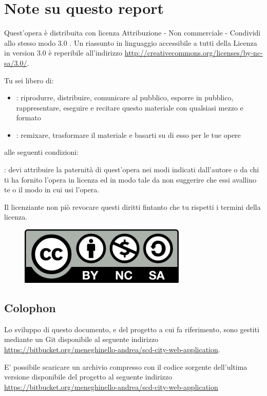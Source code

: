 %
\section*{Note su questo report}
Quest'opera è distribuita con licenza   Attribuzione - Non commerciale - Condividi allo stesso modo 3.0 . Un riassunto in linguaggio accessibile a tutti della Licenza in version 3.0 è reperibile all'indirizzo \url{http://creativecommons.org/licenses/by-nc-sa/3.0/}.

Tu sei libero di:
\begin{itemize}
\item{: riprodurre, distribuire, comunicare al pubblico, esporre in pubblico, rappresentare, eseguire e recitare questo materiale con qualsiasi mezzo e formato}
\item{: remixare, trasformare il materiale e basarti su di esso per le tue opere}
\end{itemize}
alle seguenti condizioni:

: devi attribuire la paternità di quest'opera nei modi indicati dall'autore o da chi ti ha fornito l'opera in licenza ed in modo tale da non suggerire che essi avallino te o il modo in cui usi l'opera.

Il licenziante non piò revocare questi diritti fintanto che tu rispetti i termini della licenza.

\begin{figure}[h]
\centerline{\includegraphics[scale=0.3]{images/abstract/cc-by-nc-sa.png}}
\end{figure}

\subsection*{Colophon}
Lo sviluppo di questo documento, e del progetto a cui fa riferimento, sono gestiti mediante un  Git disponibile al seguente indirizzo \url{https://bitbucket.org/meneghinello-andrea/scd-city-web-application}.

E' possibile scaricare un archivio compresso con il codice sorgente dell'ultima versione disponibile del progetto al seguente indirizzo \url{https://bitbucket.org/meneghinello-andrea/scd-city-web-application}